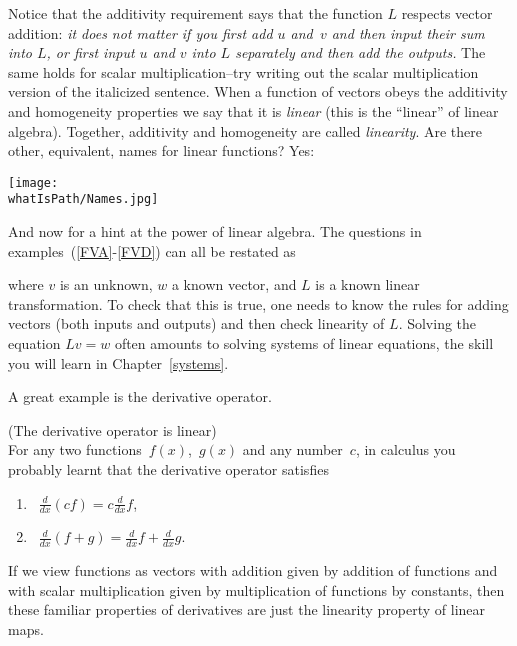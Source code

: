Notice that the additivity 
requirement says that the function $L$ respects vector addition: {\itshape it does not matter if you first add $u$ and~$v$ and then input their sum into
$L$, or first input $u$ and $v$ into $L$ separately and then add the outputs.} The same holds for scalar multiplication--try writing out the scalar multiplication version of the italicized sentence. When a function of vectors obeys the additivity and homogeneity properties we say that it is {\itshape linear} (this is the ``linear'' of linear algebra). Together, additivity and homogeneity are called {\itshape linearity}. 
Are there other, equivalent, names for linear functions? Yes:
\begin{center}
\texttt{[image: \\whatIsPath/Names.jpg]}
\\
\end{center}

And now for a hint at the power of linear algebra. 
The questions in examples~(\ref{FVA}-\ref{FVD}) can all be restated as %
\begin{center}
\end{center}
where $v$ is an unknown, $w$ a known vector, and $L$ is  a known linear transformation.
To check that this is true, one needs to know the rules for adding vectors (both inputs and outputs)
and then check linearity of $L$. Solving the equation $Lv=w$ often amounts  to solving systems of linear equations,
the skill you will learn in  Chapter~\ref{systems}.



A great example is the derivative operator.
\begin{example} (The derivative operator is linear)\\
For any two functions~$f(x)$,~$g(x)$ and any number~$c$, in calculus you probably learnt that the derivative operator satisfies
\begin{enumerate}
\item ~$\frac{d}{dx} (cf)=c\frac{d}{dx} f$, \\[-.5cm]
\item~$\frac{d}{dx}(f+g)=\frac{d}{dx}f+\frac{d}{dx}g$.\\[-.5cm]
\end{enumerate}
If we view functions  as vectors with addition given by addition of functions and with scalar multiplication given by multiplication of functions by constants, then these familiar properties of derivatives are just the linearity property of linear maps.
\end{example}

